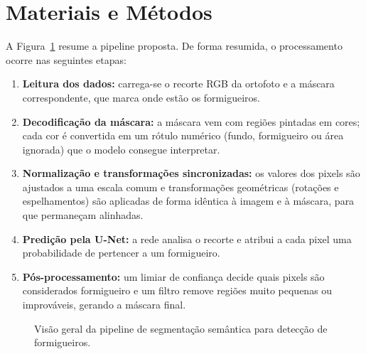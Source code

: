 \documentclass[10pt,a4paper,twocolumn]{article}
\begin{document}
\section{Materiais e Métodos}

A Figura~\ref{fig:pipeline} resume a pipeline proposta. De forma resumida, o processamento ocorre nas seguintes etapas:

\begin{enumerate}
    \item \textbf{Leitura dos dados:} carrega-se o recorte RGB da ortofoto e a máscara correspondente, que marca onde estão os formigueiros.
    \item \textbf{Decodificação da máscara:} a máscara vem com regiões pintadas em cores; cada cor é convertida em um rótulo numérico (fundo, formigueiro ou área ignorada) que o modelo consegue interpretar.
    \item \textbf{Normalização e transformações sincronizadas:} os valores dos pixels são ajustados a uma escala comum e transformações geométricas (rotações e espelhamentos) são aplicadas de forma idêntica à imagem e à máscara, para que permaneçam alinhadas.
    \item \textbf{Predição pela U-Net:} a rede analisa o recorte e atribui a cada pixel uma probabilidade de pertencer a um formigueiro.
    \item \textbf{Pós-processamento:} um limiar de confiança decide quais pixels são considerados formigueiro e um filtro remove regiões muito pequenas ou improváveis, gerando a máscara final.
\end{enumerate}

\begin{figure}[t]
\centering
{}
\caption{Visão geral da pipeline de segmentação semântica para detecção de formigueiros.}
\label{fig:pipeline}
\end{figure}
\end{document}
